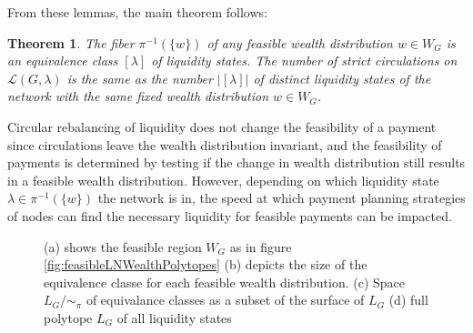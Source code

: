 \documentclass[10pt,twocolumn]{article}
\newtheorem{theorem}{Theorem}[section]
\begin{document}
From these lemmas, the main theorem follows:

\begin{theorem}
  \label{thm:circulations}
    The fiber \(\pi^{-1}(\{w\})\) of any feasible wealth distribution \(w \in W_G\) is an equivalence class \([\lambda]\) of liquidity states. The number of strict circulations on \(\mathcal{L}(G, \lambda)\) is the same as the number \(|[\lambda]|\) of distinct liquidity states of the network with the same fixed wealth distribution \(w \in W_G\).
\end{theorem}

Circular rebalancing of liquidity does not change the feasibility of a payment since circulations leave the wealth distribution invariant, and the feasibility of payments is determined by testing if the change in wealth distribution still results in a feasible wealth distribution. However, depending on which liquidity state \(\lambda \in \pi^{-1}(\{w\})\) the network is in, the speed at which payment planning strategies of nodes can find the necessary liquidity for feasible payments can be impacted.

\begin{figure}[h]
  \centering
  \hspace{1.5em}
\hspace{1.5em}
\caption{(a) shows the feasible region $W_G$ as in figure \ref{fig:feasibleLNWealthPolytopes} (b) depicts the size of the equivalence classe for each feasible wealth distribution. (c) Space $L_G/\sim_\pi$ of equivalance classes as a subset of the surface of $L_G$ (d) full polytope $L_G$ of all liquidity states}
\label{fig:equivalenceclasses}
\end{figure}
\end{document}
